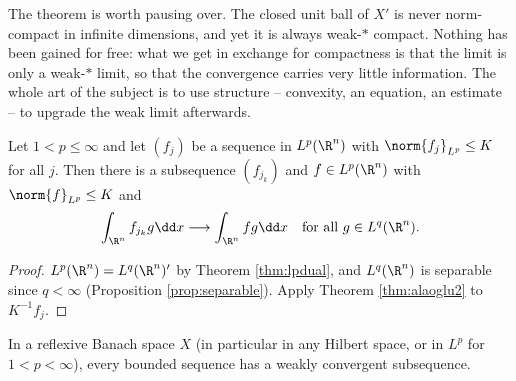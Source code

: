 The theorem is worth pausing over. The closed unit ball of $X'$ is never norm-compact in infinite dimensions, and yet it is always weak-$*$ compact. Nothing has been gained for free: what we get in exchange for compactness is that the limit is only a weak-$*$ limit, so that the convergence carries very little information. The whole art of the subject is to use structure -- convexity, an equation, an estimate -- to upgrade the weak limit afterwards.

\begin{center}
\end{center}

\begin{corollary}\label{cor:weakcompactlp}
	Let $1 < p \le \infty$ and let $(f_j)$ be a sequence in $L^p(\R^n)$ with $\norm{f_j}_{L^p}\le K$ for all $j$. Then there is a subsequence $(f_{j_k})$ and $f \in L^p(\R^n)$ with $\norm{f}_{L^p}\le K$ and
	$$\int_{\R^n} f_{j_k} g \dd x \longrightarrow \int_{\R^n} fg \dd x \quad \text{for all } g \in L^q(\R^n).$$
\end{corollary}

\begin{proof}
	$L^p(\R^n) = L^q(\R^n)'$ by Theorem \ref{thm:lpdual}, and $L^q(\R^n)$ is separable since $q < \infty$ (Proposition \ref{prop:separable}). Apply Theorem \ref{thm:alaoglu2} to $K^{-1}f_j$.
\end{proof}

\begin{corollary}\label{cor:reflexiveweak}
	In a reflexive Banach space $X$ (in particular in any Hilbert space, or in $L^p$ for $1<p<\infty$), every bounded sequence has a weakly convergent subsequence.
\end{corollary}

